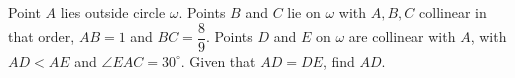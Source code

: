 Point $A$ lies outside circle $\omega$. Points $B$ and $C$ lie on $\omega$ with $A,B,C$ collinear in that order, $AB=1$ and $BC=\dfrac89$. Points $D$ and $E$ on $\omega$ are collinear with $A$, with $AD<AE$ and $\angle EAC=30^\circ$. Given that $AD=DE$, find $AD$.

